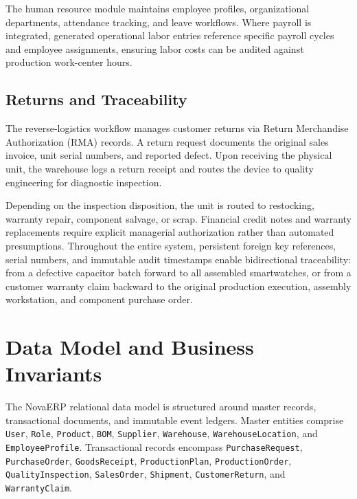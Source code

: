 \documentclass[conference]{IEEEtran}
\begin{document}
The human resource module maintains employee profiles, organizational departments, attendance tracking, and leave workflows. Where payroll is integrated, generated operational labor entries reference specific payroll cycles and employee assignments, ensuring labor costs can be audited against production work-center hours.

\subsection{Returns and Traceability}
The reverse-logistics workflow manages customer returns via Return Merchandise Authorization (RMA) records. A return request documents the original sales invoice, unit serial numbers, and reported defect. Upon receiving the physical unit, the warehouse logs a return receipt and routes the device to quality engineering for diagnostic inspection. 

Depending on the inspection disposition, the unit is routed to restocking, warranty repair, component salvage, or scrap. Financial credit notes and warranty replacements require explicit managerial authorization rather than automated presumptions. Throughout the entire system, persistent foreign key references, serial numbers, and immutable audit timestamps enable bidirectional traceability: from a defective capacitor batch forward to all assembled smartwatches, or from a customer warranty claim backward to the original production execution, assembly workstation, and component purchase order.

\section{Data Model and Business Invariants}
The NovaERP relational data model is structured around master records, transactional documents, and immutable event ledgers. Master entities comprise \texttt{User}, \texttt{Role}, \texttt{Product}, \texttt{BOM}, \texttt{Supplier}, \texttt{Warehouse}, \texttt{WarehouseLocation}, and \texttt{EmployeeProfile}. Transactional records encompass \texttt{PurchaseRequest}, \texttt{PurchaseOrder}, \texttt{GoodsReceipt}, \texttt{ProductionPlan}, \texttt{ProductionOrder}, \texttt{QualityInspection}, \texttt{SalesOrder}, \texttt{Shipment}, \texttt{CustomerReturn}, and \texttt{WarrantyClaim}.
\end{document}
